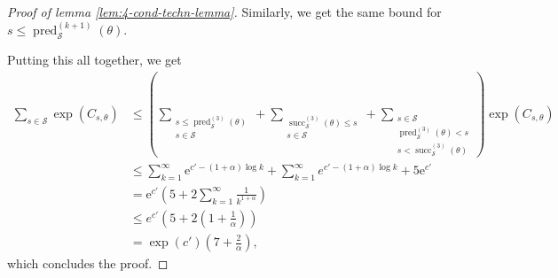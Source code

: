 \documentclass{article}
\theoremstyle{definition}
\theoremstyle{definition}
\newcommand{\e}{\mathrm{e}}
\begin{document}
\begin{proof}[Proof of lemma \ref{lem:4-cond-techn-lemma}]
    Similarly, we get the same bound for $s \le \operatorname{pred}_{\mathcal{S}}^{(k+1)}(\theta)$.
    
    Putting this all together, we get
    \begin{align*}
        \sum_{s\in\mathcal{S}}
            \exp(C_{s,\theta}) &\le
            \left(\sum_{\substack{s \le \operatorname{pred}_{\mathcal{S}}^{(3)}(\theta) \\ s\in\mathcal{S}}}
            +
            \sum_{\substack{\operatorname{succ}_{\mathcal{S}}^{(3)}(\theta) \le s \\ s\in\mathcal{S}}}
            +
            \sum_{\substack{s\in \mathcal{S} \\ \operatorname{pred}_{\mathcal{S}}^{(3)}(\theta) < s \\ s < \operatorname{succ}_{\mathcal{S}}^{(3)}(\theta)}}
            \right) \exp(C_{s,\theta})
            \\
            &\le \sum_{k=1}^\infty \e^{c'-(1+\alpha)\log k} + \sum_{k=1}^\infty e^{c'-(1+\alpha)\log k} + 5\e^{c'} 
            \\
            &= \e^{c'} \left(5 + 2\sum_{k=1}^{\infty} \frac{1}{k^{1+\alpha}}\right) 
            \\
            &\le
            e^{c'} \left(5 + 2\left(1 + \frac{1}{\alpha}\right)\right)
            \\
            &=
            \exp(c')\left(7 + \frac{2}{\alpha}\right),
    \end{align*}
    which concludes the proof.
\end{proof}
\end{document}
